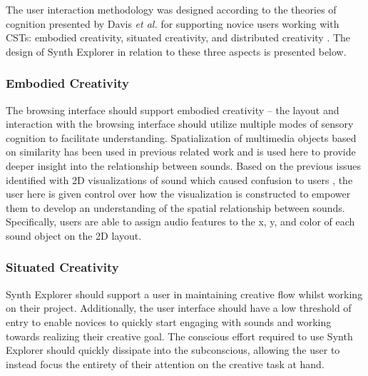 The user interaction methodology was designed according to the theories of cognition presented by Davis \textit{et al.} for supporting novice users working with CSTs: embodied creativity, situated creativity, and distributed creativity \cite{davis2013toward}. The design of Synth Explorer in relation to these three aspects is presented below.

\subsubsection{Embodied Creativity}
The browsing interface should support embodied creativity -- the layout and interaction with the browsing interface should utilize multiple modes of sensory cognition to facilitate understanding. Spatialization of multimedia objects based on similarity has been used in previous related work \cite{10.1145/3325480.3325506} and is used here to provide deeper insight into the relationship between sounds. Based on the previous issues identified with 2D visualizations of sound which caused confusion to users \cite{turquois2016exploring}, the user here is given control over how the visualization is constructed to empower them to develop an understanding of the spatial relationship between sounds. Specifically, users are able to assign audio features to the x, y, and color of each sound object on the 2D layout.

\subsubsection{Situated Creativity}
Synth Explorer should support a user in maintaining creative flow whilst working on their project. Additionally, the user interface should have a low threshold of entry to enable novices to quickly start engaging with sounds and working towards realizing their creative goal. The conscious effort required to use Synth Explorer should quickly dissipate into the subconscious, allowing the user to instead focus the entirety of their attention on the creative task at hand.


